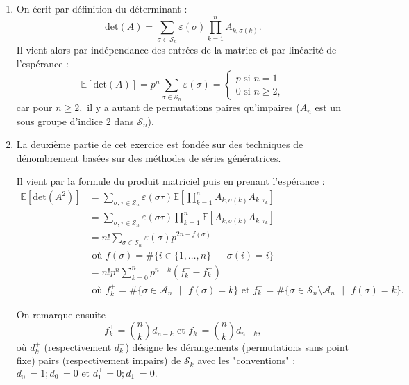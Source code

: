 \begin{enumerate}
\item On écrit par d\'{e}finition du déterminant :
$$\mbox{det}(A) = \sum_{\sigma\in \mathcal{S}_{n}}\varepsilon(\sigma)\prod_{k=1}^{n}A_{k,\sigma(k)}.$$
Il vient alors par ind\'{e}pendance des entr\'{e}es de la matrice et par linéarité de l'espérance :
$$\mathbb{E}[\mbox{det}(A)]= p^{n}\sum_{\sigma\in\mathcal{S}_{n}}\varepsilon(\sigma)=\left\{ \begin{array}{l}
p \mbox{ si } n=1\\
0 \mbox{ si } n\geq 2,
\end{array}\right.$$
car pour $n\geq 2,$ il y a autant de permutations paires qu'impaires ($A_{n}$ est un sous groupe d'indice $2$ dans $\mathcal{S}_{n}$).\\

\item La deuxième partie de cet exercice est fondée sur des techniques de dénombrement basées sur des méthodes de séries génératrices. 

Il vient par la formule du produit matriciel puis en prenant l'espérance :
\begin{align*}
\mathbb{E}[\mbox{det}(A^{2})] & = \sum_{\sigma,\tau\in \mathcal{S}_{n}}\varepsilon(\sigma\tau)\mathbb{E}[\prod_{k=1}^{n}A_{k,\sigma(k)}A_{k,\tau_{k}}]\\
& =\sum_{\sigma,\tau\in \mathcal{S}_{n}}\varepsilon(\sigma\tau)\prod_{k=1}^{n}\mathbb{E}[A_{k,\sigma(k)}A_{k,\tau_{k}}]\\
& = n!\sum_{\sigma\in \mathcal{S}_{n}}\varepsilon(\sigma)p^{2n-f(\sigma)}\\
& \mbox{ où } f(\sigma)=\#\{i\in\{1,\ldots,n\}\mbox{ }|\mbox{ } \sigma(i)=i\}\\
&  = n!p^{n}\sum_{k=0}^{n}p^{n-k}\left(f_{k}^{+}-f_{k}^{-}\right)\\
& \mbox{ où } f_{k}^{+}=\#\{\sigma\in \mathcal{A}_{n}\mbox{ }|\mbox{ } f(\sigma)=k\} \mbox{ et } f_{k}^{-}=\#\{\sigma\in \mathcal{S}_{n}\setminus{\mathcal{A}_{n}}\mbox{ }|\mbox{ } f(\sigma)=k\}.
\end{align*}

On remarque ensuite $$f_{k}^{+}=\binom{n}{k}d_{n-k}^{+} \mbox{ et } f_{k}^{-}=\binom{n}{k}d_{n-k}^{-},$$ où $d_{k}^{+}$ (respectivement $d_{k}^{-}$) désigne les dérangements (permutations sans point fixe) pairs (respectivement impairs) de $\mathcal{S}_{k}$ avec les "conventions" : $\displaystyle d_{0}^{+}=1;d_{0}^{-}=0 \mbox{ et } d_{1}^{+}=0;d_{1}^{-}=0.$ 


\end{enumerate}
